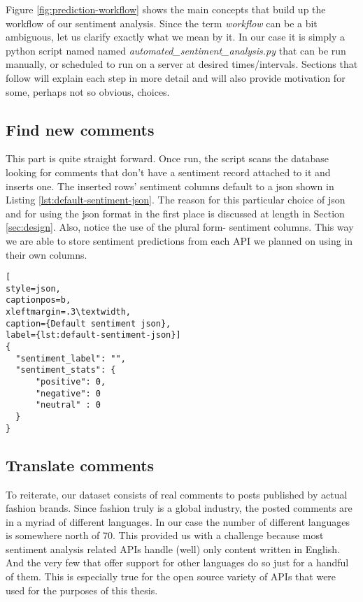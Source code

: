 

Figure \ref{fig:prediction-workflow} shows the main concepts that build up the workflow of our sentiment analysis. 
Since the term \textit{workflow} can be a bit ambiguous, let us clarify exactly what we mean by it. In our case it is simply a python script named named \textit{automated\_sentiment\_analysis.py} that can be run manually, or scheduled to run on a server at desired times/intervals. 
Sections that follow will explain each step in more detail and will also provide motivation for some, perhaps not so obvious, choices.


\subsection*{Find new comments\label{sec:find-new-comments}}
This part is quite straight forward.
Once run, the script scans the database looking for comments that don't have a sentiment record attached to it and inserts one.   
The inserted rows' sentiment columns default to a json shown in Listing \ref{lst:default-sentiment-json}. The reason for this particular choice of json and for using the json format in the first place is discussed at length in Section \ref{sec:design}. Also, notice the use of the plural form- sentiment columns. This way we are able to store sentiment predictions from each API we planned on using in their own columns.

\begin{lstlisting}[
style=json,
captionpos=b,
xleftmargin=.3\textwidth,
caption={Default sentiment json},
label={lst:default-sentiment-json}]
{
  "sentiment_label": "",
  "sentiment_stats": {
      "positive": 0,
      "negative": 0
      "neutral" : 0
  }
}
\end{lstlisting}


\subsection*{Translate comments \label{sec:translate-comments}}
To reiterate, our dataset consists of real comments to posts published by actual fashion brands. Since fashion truly is a global industry, the posted comments are in a myriad of different languages. In our case the number of different languages is somewhere north of 70. 
This provided us with a challenge because most sentiment analysis related APIs handle (well) only content written in English. And the very few that offer support for other languages do so just for a handful of them. This is especially true for the open source variety of APIs that were used for the purposes of this thesis. 

